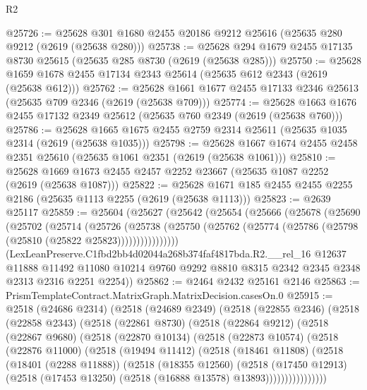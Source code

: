 \begin{lexlean}{R2}
\begin{coremodule}
@25726 := @25628 @301 @1680 @2455 @20186 @9212 @25616 (@25635 @280 @9212 (@2619 (@25638 @280)))
@25738 := @25628 @294 @1679 @2455 @17135 @8730 @25615 (@25635 @285 @8730 (@2619 (@25638 @285)))
@25750 := @25628 @1659 @1678 @2455 @17134 @2343 @25614 (@25635 @612 @2343 (@2619 (@25638 @612)))
@25762 := @25628 @1661 @1677 @2455 @17133 @2346 @25613 (@25635 @709 @2346 (@2619 (@25638 @709)))
@25774 := @25628 @1663 @1676 @2455 @17132 @2349 @25612 (@25635 @760 @2349 (@2619 (@25638 @760)))
@25786 := @25628 @1665 @1675 @2455 @2759 @2314 @25611 (@25635 @1035 @2314 (@2619 (@25638 @1035)))
@25798 := @25628 @1667 @1674 @2455 @2458 @2351 @25610 (@25635 @1061 @2351 (@2619 (@25638 @1061)))
@25810 := @25628 @1669 @1673 @2455 @2457 @2252 @23667 (@25635 @1087 @2252 (@2619 (@25638 @1087)))
@25822 := @25628 @1671 @185 @2455 @2455 @2255 @2186 (@25635 @1113 @2255 (@2619 (@25638 @1113)))
@25823 := @2639 @25117
@25859 := @25604
    (@25627
      (@25642
        (@25654
          (@25666
            (@25678
              (@25690
                (@25702
                  (@25714
                    (@25726
                      (@25738
                        (@25750
                          (@25762 (@25774 (@25786 (@25798 (@25810 (@25822 @25823))))))))))))))))
      (LexLeanPreserve.C1fbd2bb4d02044a268b374faf4817bda.R2.__rel_16
        @12637
        @11888
        @11492
        @11080
        @10214
        @9760
        @9292
        @8810
        @8315
        @2342
        @2345
        @2348
        @2313
        @2316
        @2251
        @2254))
@25862 := @2464 @2432 @25161 @2146
@25863 := PrismTemplateContract.MatrixGraph.MatrixDecision.casesOn.{0}
@25915 := @2518
    (@24686 @2314)
    (@2518
      (@24689 @2349)
      (@2518
        (@22855 @2346)
        (@2518
          (@22858 @2343)
          (@2518
            (@22861 @8730)
            (@2518
              (@22864 @9212)
              (@2518
                (@22867 @9680)
                (@2518
                  (@22870 @10134)
                  (@2518
                    (@22873 @10574)
                    (@2518
                      (@22876 @11000)
                      (@2518
                        (@19494 @11412)
                        (@2518
                          (@18461 @11808)
                          (@2518
                            (@18401 (@2288 @11888))
                            (@2518
                              (@18355 @12560)
                              (@2518
                                (@17450 @12913)
                                (@2518 (@17453 @13250) (@2518 (@16888 @13578) @13893))))))))))))))))

\end{coremodule}
\end{lexlean}
